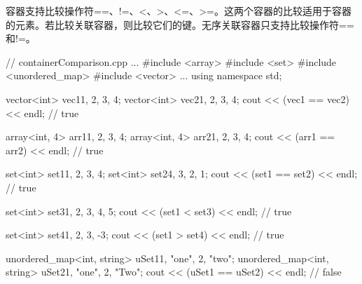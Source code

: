 容器支持比较操作符==、!=、<、>、<=、>=。这两个容器的比较适用于容器的元素。若比较关联容器，则比较它们的键。无序关联容器只支持比较操作符==和!=。


\begin{cpp}
// containerComparison.cpp
...
#include <array>
#include <set>
#include <unordered_map>
#include <vector>
...
using namespace std;

vector<int> vec1{1, 2, 3, 4};
vector<int> vec2{1, 2, 3, 4};
cout << (vec1 == vec2) << endl; // true

array<int, 4> arr1{1, 2, 3, 4};
array<int, 4> arr2{1, 2, 3, 4};
cout << (arr1 == arr2) << endl; // true

set<int> set1{1, 2, 3, 4};
set<int> set2{4, 3, 2, 1};
cout << (set1 == set2) << endl; // true

set<int> set3{1, 2, 3, 4, 5};
cout << (set1 < set3) << endl; // true

set<int> set4{1, 2, 3, -3};
cout << (set1 > set4) << endl; // true

unordered_map<int, string> uSet1{{1, "one"}, {2, "two"}};
unordered_map<int, string> uSet2{{1, "one"}, {2, "Two"}};
cout << (uSet1 == uSet2) << endl; // false
\end{cpp}










